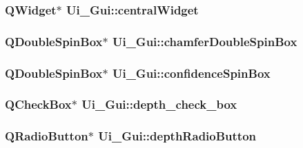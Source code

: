 \label{classUi__Gui_a393c5c0093fc0f98911b5f6a9cdaa4d4}
\hypertarget{classUi__Gui_a06f615058bbc7a53092971485610646c}{
\subsubsection[{centralWidget}]{\setlength{\rightskip}{0pt plus 5cm}QWidget$\ast$ {\bf Ui\_\-Gui::centralWidget}}}
\label{classUi__Gui_a06f615058bbc7a53092971485610646c}
\hypertarget{classUi__Gui_acfed8700f62532a1047c5ba7b644612c}{
\subsubsection[{chamferDoubleSpinBox}]{\setlength{\rightskip}{0pt plus 5cm}QDoubleSpinBox$\ast$ {\bf Ui\_\-Gui::chamferDoubleSpinBox}}}
\label{classUi__Gui_acfed8700f62532a1047c5ba7b644612c}
\hypertarget{classUi__Gui_abe54d148aadd144c122e1ed269a5f572}{
\subsubsection[{confidenceSpinBox}]{\setlength{\rightskip}{0pt plus 5cm}QDoubleSpinBox$\ast$ {\bf Ui\_\-Gui::confidenceSpinBox}}}
\label{classUi__Gui_abe54d148aadd144c122e1ed269a5f572}
\hypertarget{classUi__Gui_acefd050dfe993330f502e10660be3fe0}{
\subsubsection[{depth\_\-check\_\-box}]{\setlength{\rightskip}{0pt plus 5cm}QCheckBox$\ast$ {\bf Ui\_\-Gui::depth\_\-check\_\-box}}}
\label{classUi__Gui_acefd050dfe993330f502e10660be3fe0}
\hypertarget{classUi__Gui_a700c0982fcedc0bc21592250f8880bfc}{
\subsubsection[{depthRadioButton}]{\setlength{\rightskip}{0pt plus 5cm}QRadioButton$\ast$ {\bf Ui\_\-Gui::depthRadioButton}}}
